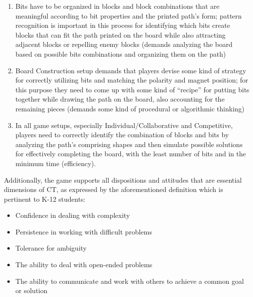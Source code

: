 \documentclass{acm_proc_article-sp}
\begin{document}
\begin{enumerate}
\item{Bits have to be organized in blocks and block combinations that are meaningful according to bit properties and the printed path's form; pattern recognition is important in this process for identifying which bits create blocks that can fit the path printed on the board while also attracting adjacent blocks or repelling enemy blocks (demands analyzing the board based on possible bits combinations and organizing them on the path)}
\item{Board Construction setup demands that players devise some kind of strategy for correctly utilizing bits and matching the polarity and magnet position; for this purpose they need to come up with some kind of ``recipe'' for putting bits together while drawing the path on the board, also accounting for the remaining pieces (demands some kind of procedural or algorithmic thinking)}
\item{In all game setups, especially Individual/Collaborative and Competitive, players need to correctly identify the combination of blocks and bits by analyzing the path's comprising shapes and then simulate possible solutions for effectively completing the board, with the least number of bits and in the minimum time (efficiency).}
\end{enumerate}

Additionally, the game supports all dispositions and attitudes that are essential dimensions of CT, as expressed by the aforementioned definition which is pertinent to K-12 students:
\begin{itemize}
       \item Confidence in dealing with complexity
       \item Persistence in working with difficult problems
       \item Tolerance for ambiguity
       \item The ability to deal with open-ended problems
       \item The ability to communicate and work with others to achieve a common goal or solution
\end{itemize}

\end{document}

